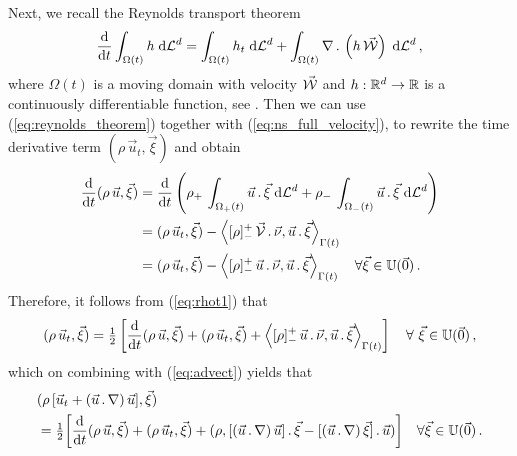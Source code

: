 Next, we recall the Reynolds transport theorem
\begin{equation}\label{eq:reynolds_theorem}
\frac{\rm d}{{\rm d}t} \int_{\Omega(t)} h\;{\rm d}{\cal L}^{d}=\int_{\Omega(t)} h_t \;{\rm d}{\cal L}^{d} +
\int_{\Omega(t)} \nabla\,.\,\left(h\,\vec{\mathcal W}\right)\;{\rm d}{\cal L}^{d}\,,
\end{equation}
where $\Omega(t)$ is a moving domain with velocity $\vec{\mathcal W}$ and $h:\mathbb R^d\to\mathbb R$ is a
continuously differentiable function, see \cite{Aris89}. Then we can use
(\ref{eq:reynolds_theorem}) together with (\ref{eq:ns_full_velocity}), to
rewrite the time derivative term $(\rho\,\vec u_t,\vec \xi)$ and obtain
\begin{align}\label{eq:rhot1}
\frac{\rm d}{{\rm d}t}(\rho \,\vec u, \vec \xi) & =
\frac{\rm d}{{\rm d}t}\left(\rho_+\,\int_{\Omega_+(t)} \vec u \,.\,\vec \xi \;{\rm d}{\cal L}^{d}
+ \rho_-\,\int_{\Omega_-(t)} \vec u\,.\,\vec \xi \;{\rm d}{\cal L}^{d}  \right) \nonumber \\
& =  (\rho\,\vec u_t, \vec \xi)
-\left\langle [\rho]_-^+\,\vec{\mathcal{V}}\,.\,\vec\nu, \vec u \,.\,\vec \xi
\right\rangle_{\Gamma(t)} \nonumber \\
&= (\rho\,\vec u_t, \vec \xi)- \left\langle [\rho]_-^+\,\vec u\,.\,\vec \nu,
\vec u \,.\,\vec \xi \right\rangle_{\Gamma(t)}
\quad \forall \vec \xi \in \mathbb{U}(\vec{0})\,.
\end{align}
Therefore, it follows from (\ref{eq:rhot1}) that
\begin{equation*}
(\rho\,\vec u_t, \vec \xi) =
\tfrac{1}{2} \left[
\frac{\rm d}{{\rm d}t} (\rho\,\vec u,\vec \xi) + (\rho\,\vec u_t, \vec \xi)
+ \left\langle [\rho]_-^+\,\vec u\,.\,\vec \nu,
\vec u \,.\,\vec \xi \right\rangle_{\Gamma(t)}
\right]
\quad \forall\ \vec \xi \in \mathbb{U}(\vec{0})\,,
\end{equation*}
which on combining with (\ref{eq:advect}) yields that
\begin{align} \label{eq:rhot3}
& (\rho\,[\vec u_t + (\vec u\,.\,\nabla)\,\vec u], \vec \xi) \nonumber \\
& = \tfrac{1}{2}\bigg[ \frac{\rm d}{{\rm d}t} (\rho\,\vec u, \vec \xi)
+ (\rho\,\vec u_t, \vec \xi) + (\rho, [(\vec u\,.\,\nabla)\,\vec u]\,.\,\vec \xi
- [(\vec u\,.\,\nabla)\,\vec \xi]\,.\,\vec u) \bigg]
\quad \forall \vec \xi \in \mathbb{U}(\vec{0})\,.
\end{align}

